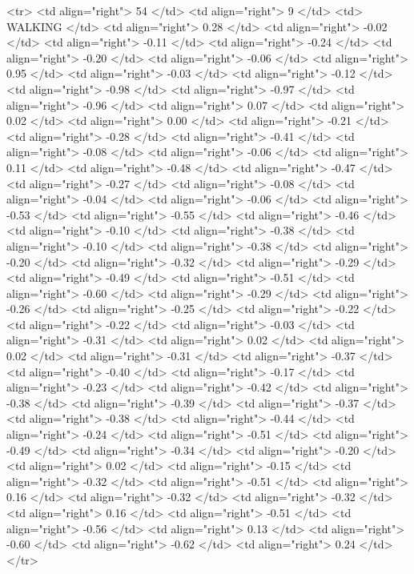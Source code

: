   <tr> <td align="right"> 54 </td> <td align="right">   9 </td> <td> WALKING </td> <td align="right"> 0.28 </td> <td align="right"> -0.02 </td> <td align="right"> -0.11 </td> <td align="right"> -0.24 </td> <td align="right"> -0.20 </td> <td align="right"> -0.06 </td> <td align="right"> 0.95 </td> <td align="right"> -0.03 </td> <td align="right"> -0.12 </td> <td align="right"> -0.98 </td> <td align="right"> -0.97 </td> <td align="right"> -0.96 </td> <td align="right"> 0.07 </td> <td align="right"> 0.02 </td> <td align="right"> 0.00 </td> <td align="right"> -0.21 </td> <td align="right"> -0.28 </td> <td align="right"> -0.41 </td> <td align="right"> -0.08 </td> <td align="right"> -0.06 </td> <td align="right"> 0.11 </td> <td align="right"> -0.48 </td> <td align="right"> -0.47 </td> <td align="right"> -0.27 </td> <td align="right"> -0.08 </td> <td align="right"> -0.04 </td> <td align="right"> -0.06 </td> <td align="right"> -0.53 </td> <td align="right"> -0.55 </td> <td align="right"> -0.46 </td> <td align="right"> -0.10 </td> <td align="right"> -0.38 </td> <td align="right"> -0.10 </td> <td align="right"> -0.38 </td> <td align="right"> -0.20 </td> <td align="right"> -0.32 </td> <td align="right"> -0.29 </td> <td align="right"> -0.49 </td> <td align="right"> -0.51 </td> <td align="right"> -0.60 </td> <td align="right"> -0.29 </td> <td align="right"> -0.26 </td> <td align="right"> -0.25 </td> <td align="right"> -0.22 </td> <td align="right"> -0.22 </td> <td align="right"> -0.03 </td> <td align="right"> -0.31 </td> <td align="right"> 0.02 </td> <td align="right"> 0.02 </td> <td align="right"> -0.31 </td> <td align="right"> -0.37 </td> <td align="right"> -0.40 </td> <td align="right"> -0.17 </td> <td align="right"> -0.23 </td> <td align="right"> -0.42 </td> <td align="right"> -0.38 </td> <td align="right"> -0.39 </td> <td align="right"> -0.37 </td> <td align="right"> -0.38 </td> <td align="right"> -0.44 </td> <td align="right"> -0.24 </td> <td align="right"> -0.51 </td> <td align="right"> -0.49 </td> <td align="right"> -0.34 </td> <td align="right"> -0.20 </td> <td align="right"> 0.02 </td> <td align="right"> -0.15 </td> <td align="right"> -0.32 </td> <td align="right"> -0.51 </td> <td align="right"> 0.16 </td> <td align="right"> -0.32 </td> <td align="right"> -0.32 </td> <td align="right"> 0.16 </td> <td align="right"> -0.51 </td> <td align="right"> -0.56 </td> <td align="right"> 0.13 </td> <td align="right"> -0.60 </td> <td align="right"> -0.62 </td> <td align="right"> 0.24 </td> </tr>
